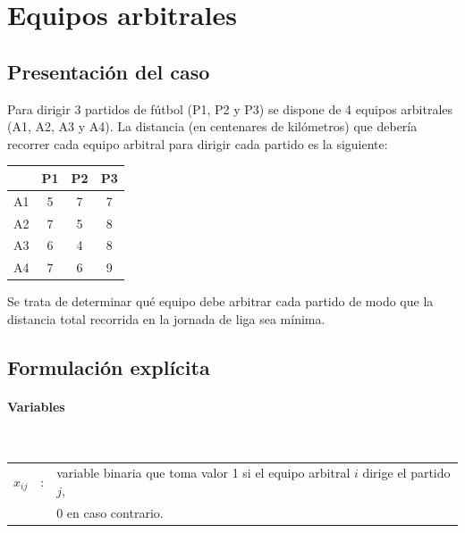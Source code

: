\section{Equipos arbitrales}


\subsection{Presentación del caso}
Para dirigir 3 partidos de fútbol (P1, P2 y P3) se dispone de 4 equipos arbitrales (A1, A2, A3 y A4). La distancia (en centenares de kilómetros) que debería recorrer cada equipo arbitral para dirigir cada partido es la siguiente:

\begin{center}
\begin{tabular}{c|ccc}
 & P1 & P2 & P3 \\
\hline
A1 & 5 & 7 & 7 \\
A2 & 7 & 5 & 8 \\
A3 & 6 & 4 & 8 \\
A4 & 7 & 6 & 9 \\
\end{tabular}
\end{center}

Se trata de determinar qué equipo debe arbitrar cada partido de modo que la distancia total recorrida en la jornada de liga sea mínima.

\subsection{Formulación explícita}

\paragraph{Variables}\mbox{}\\
\begin{tabular}{l c l}
    $x_{ij}$ & : & variable binaria que toma valor 1 si el equipo arbitral $i$ dirige el partido $j$,\\
    & & 0 en caso contrario.\\
\end{tabular}

